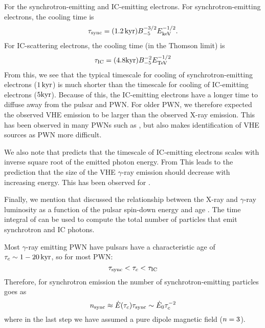 For the synchrotron-emitting and \ac{IC}-emitting electrons.
For synchrotron-emitting electrons, the cooling time is
\begin{equation}
  \tau_\text{sync} = (1.2\,\text{k}\text{yr}) B_{-5}^{-3/2} E_\text{keV}^{-1/2}.
\end{equation}
For \ac{IC}-scattering electrons, the cooling time (in the Thomson
limit) is
\begin{equation}
  \eqnlabel{ic_timescale}
  \lifetime_\text{IC} = (4.8\kyr) B_{-5}^{-2} \energy_\tev^{-1/2}
\end{equation}
From this, we see that the typical timescale for cooling of
synchrotron-emitting electrons ($1\,\text{k}\text{yr}$) is much shorter than
the timescale for cooling of \ac{IC}-emitting electrons ($5\text{k}\text{yr}$). Because
of this, the \ac{IC}-emitting electrons have a longer time to diffuse
away from the pulsar and \ac{PWN}.  For older \ac{PWN}, we therefore
expected the observed \ac{VHE} emission to be larger than the observed
X-ray emission.  This has been observed in many \acp{PWN} such as
 \cite{aharonian_2006a_h.e.s.s.-survey}, but also makes
identification of \ac{VHE} sources as \ac{PWN} more difficult.

We also note that  predicts that the timescale
of \ac{IC}-emitting electrons scales with inverse square root of
the emitted photon energy. From This leads to the prediction that
the size of the \ac{VHE} $\gamma$-ray emission should decrease
with increasing energy. This has been observed for 
\citep{aharonian_2006a_energy-dependent}.

Finally, we mention that \cite{mattana_2009_evolution-gamma-} discussed
the relationship between the X-ray and $\gamma$-ray luminosity as a
function of the pulsar spin-down energy \energydot and age \PulsarAge.
The time integral of  can be used to compute
the total number of particles that emit synchrotron and \ac{IC} photons.

Most $\gamma$-ray emitting \ac{PWN} have pulsars have a characteristic
age of $\tau_c\sim1-20\,\text{k}\text{yr}$, so for most \ac{PWN}:
\begin{equation}
  \tau_\text{sync} < \tau_c < \tau_\text{IC}
\end{equation}
Therefore, for synchrotron emission the number of synchrotron-emitting
particles goes as
\begin{equation}
  n_\text{sync} \approx \dot{E}(\tau_c) \tau_\text{sync} \sim \dot{E}_0 \tau_c^{-2}
\end{equation}
where in the last step we have assumed a pure dipole magnetic field
($n=3$).

